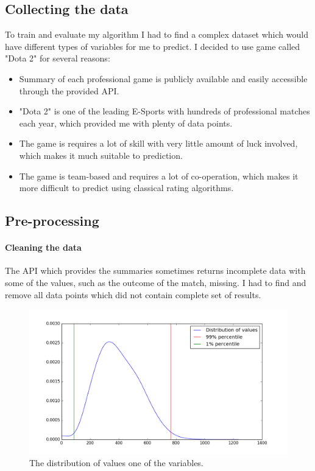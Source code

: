 \documentclass[12pt,a4paper]{book}
\begin{document}
\subsection{Collecting the data}
To train and evaluate my algorithm I had to find a complex dataset which would have different types of variables for me to predict.
I decided to use game called "Dota 2" for several reasons:
\begin{itemize}
\item Summary of each professional game is publicly available and easily accessible through the provided API.
\item "Dota 2" is one of the leading E-Sports with hundreds of professional matches each year, which provided me with plenty of data points.
\item The game is requires a lot of skill with very little amount of luck involved, which makes it much suitable to prediction.
\item The game is team-based and requires a lot of co-operation, which makes it more difficult to predict using classical rating algorithms.
\end{itemize}
\begin{figure}

\end{figure}
\subsection{Pre-processing}
\paragraph{Cleaning the data}
The API which provides the summaries sometimes returns incomplete data with some of the values, such as the outcome of the match, missing.
I had to find and remove all data points which did not contain complete set of results.
\begin{figure}[ht]
\centering
\includegraphics[scale=0.5]{outliers}
\caption{The distribution of values one of the variables.}
\label{fig:outliers}
\end{figure}
\end{document}
